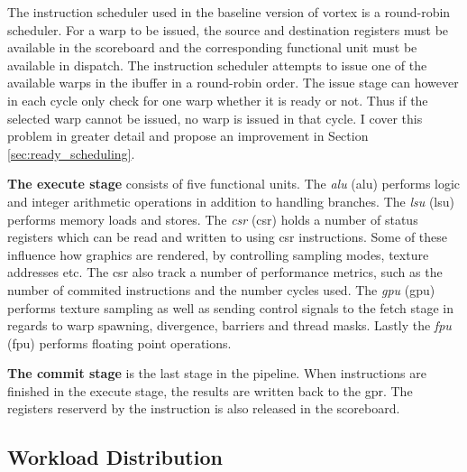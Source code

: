 The instruction scheduler used in the baseline version of \Gls{vortex} is a round-robin scheduler. For a warp to be issued, the source and destination registers must be available in the scoreboard and the corresponding functional unit must be available in dispatch. The instruction scheduler attempts to issue one of the available warps in the ibuffer in a round-robin order. The issue stage can however in each cycle only check for one warp whether it is ready or not. Thus if the selected warp cannot be issued, no warp is issued in that cycle. I cover this problem in greater detail and propose an improvement in Section \ref{sec:ready_scheduling}. 

\vspace{1mm}\noindent
\textbf{The execute stage} consists of five functional units. The \textit{\acrlong{alu}} (\acrshort{alu}) performs logic and integer arithmetic operations in addition to handling branches. The \textit{\acrlong{lsu}} (\acrshort{lsu}) performs memory loads and stores. The \textit{\acrlong{csr}} (\acrshort{csr}) holds a number of status registers which can be read and written to using csr instructions. Some of these influence how graphics are rendered, by controlling sampling modes, texture addresses etc. The \acrshort{csr} also track a number of performance metrics, such as the number of commited instructions and the number cycles used. The \textit{\acrlong{gpu}} (\acrshort{gpu}) performs texture sampling as well as sending control signals to the fetch stage in regards to warp spawning, divergence, barriers and thread masks. Lastly the \textit{\acrlong{fpu}} (\acrshort{fpu}) performs floating point operations.

\vspace{1mm}\noindent
\textbf{The commit stage} is the last stage in the pipeline. When instructions are finished in the execute stage, the results are written back to the \acrfull{gpr}. The registers reserverd by the instruction is also released in the scoreboard.

\subsection{Workload Distribution}

